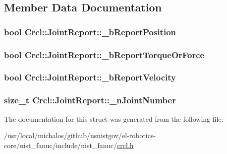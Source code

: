 \subsection{Member Data Documentation}
\hypertarget{structCrcl_1_1JointReport_a768a2ddefebd748006d8295f863a2faf}{
\subsubsection[{\-\_\-b\-Report\-Position}]{\setlength{\rightskip}{0pt plus 5cm}bool Crcl\-::\-Joint\-Report\-::\-\_\-b\-Report\-Position}}\label{structCrcl_1_1JointReport_a768a2ddefebd748006d8295f863a2faf}
\hypertarget{structCrcl_1_1JointReport_a8688287259bf8e0619a6f4a06a3c5721}{
\subsubsection[{\-\_\-b\-Report\-Torque\-Or\-Force}]{\setlength{\rightskip}{0pt plus 5cm}bool Crcl\-::\-Joint\-Report\-::\-\_\-b\-Report\-Torque\-Or\-Force}}\label{structCrcl_1_1JointReport_a8688287259bf8e0619a6f4a06a3c5721}
\hypertarget{structCrcl_1_1JointReport_aea4383b9bb5263ec07cc151d574442c9}{
\subsubsection[{\-\_\-b\-Report\-Velocity}]{\setlength{\rightskip}{0pt plus 5cm}bool Crcl\-::\-Joint\-Report\-::\-\_\-b\-Report\-Velocity}}\label{structCrcl_1_1JointReport_aea4383b9bb5263ec07cc151d574442c9}
\hypertarget{structCrcl_1_1JointReport_ac49defefe1565597177b1363dec3eb66}{
\subsubsection[{\-\_\-n\-Joint\-Number}]{\setlength{\rightskip}{0pt plus 5cm}size\-\_\-t Crcl\-::\-Joint\-Report\-::\-\_\-n\-Joint\-Number}}\label{structCrcl_1_1JointReport_ac49defefe1565597177b1363dec3eb66}


The documentation for this struct was generated from the following file\-:\begin{DoxyCompactItemize}
\item 
/usr/local/michalos/github/usnistgov/el-\/robotics-\/core/nist\-\_\-fanuc/include/nist\-\_\-fanuc/\hyperlink{crcl_8h}{crcl.\-h}\end{DoxyCompactItemize}
